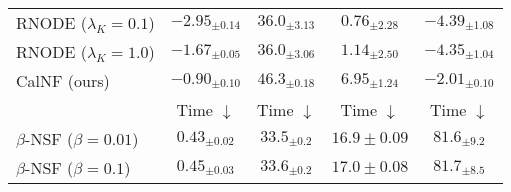 \begin{table}[htb]
\begin{center}
\begin{small}
\begin{sc}
\begin{tabular}{lcccc}
                    RNODE ($\lambda_K = 0.1$)    & $-2.95_{\pm 0.14}$          & $36.0_{\pm 3.13}$                                & $0.76_{\pm 2.28}$          & $-4.39_{\pm 1.08}$                               \\ %
                    RNODE ($\lambda_K = 1.0$)    & $-1.67_{\pm 0.05}$          & $36.0_{\pm 3.06}$                                & $1.14_{\pm 2.50}$          & $-4.35_{\pm 1.04}$                               \\ %
                    CalNF (ours)                 & $\mathbf{-0.90}_{\pm 0.10}$ & $\mathbf{46.3}_{\pm 0.18}$                       & $\mathbf{6.95}_{\pm 1.24}$ & $\mathbf{-2.01}_{\pm 0.10}$                      \\ %
                    \midrule
                                                 & Time $\downarrow$           & Time $\downarrow$                                & Time $\downarrow$          & Time $\downarrow$                                \\ %
                    $\beta$-NSF ($\beta = 0.01$) & $\mathbf{0.43}_{\pm 0.02}$  & $33.5_{\pm 0.2}$                                 & $\mathbf{16.9} \pm 0.09$   & $\mathbf{81.6}_{\pm 9.2}$                        \\ %
                    $\beta$-NSF ($\beta = 0.1$)  & $\mathbf{0.45}_{\pm 0.03}$  & $33.6_{\pm 0.2}$                                 & $\mathbf{17.0} \pm 0.08$   & $\mathbf{81.7}_{\pm 8.5}$                        \\ %

\end{tabular}
\end{sc}
\end{small}
\end{center}
\end{table}
